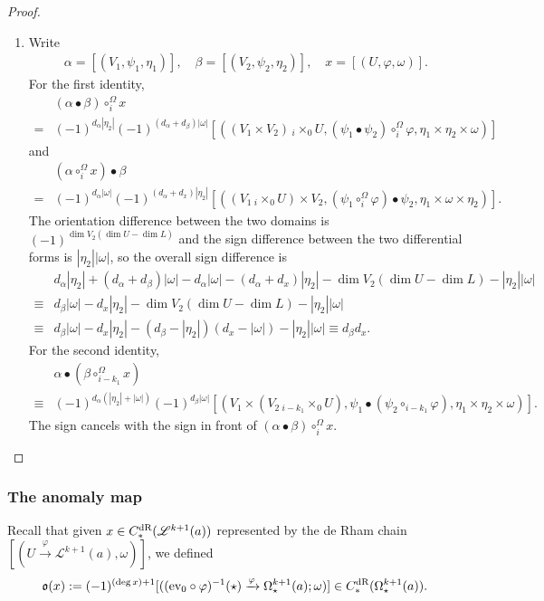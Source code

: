 \documentclass[10pt]{amsart}
\numberwithin{equation}{section}
\theoremstyle{plain}
\theoremstyle{definition}
\theoremstyle{remark}
\numberwithin{equation}{section}
\newcommand{\ev}{\textup{ev}}
\newcommand{\dR}{\textup{dR}}
\newcommand{\fiberprod}[2]{\,_{#1}\!\!\times_{#2} }
\begin{document}
{\begin{proof}
\begin{enumerate}
		\item Write \begin{align*}
			\alpha = [(V_1, \psi_1,\eta_1)], \quad \beta = [(V_2,\psi_2,\eta_2)], \quad x=[(U,\varphi,\omega)].
		\end{align*}
		For the first identity, 
		\begin{align*}
			&(\alpha\bullet \beta)\circ_i^\Omega x \\
			=& (-1)^{d_\alpha|\eta_2|} (-1)^{(d_\alpha+d_\beta)|\omega|}[((V_1\times V_2)\fiberprod{i}{0}U, (\psi_1\bullet \psi_2)\circ_i^\Omega \varphi, \eta_1\times \eta_2 \times \omega)]
		\end{align*}
		and 
		\begin{align*}
			&(\alpha\circ_i^\Omega x)\bullet \beta \\
			=&(-1)^{d_\alpha|\omega|}(-1)^{(d_\alpha +d_x)|\eta_2|}[((V_1\fiberprod{i}{0}U)\times V_2, (\psi_1\circ_i^\Omega \varphi)\bullet \psi_2, \eta_1\times \omega\times \eta_2)].
		\end{align*}
		The orientation difference between the two domains is $(-1)^{\dim V_2(\dim U-\dim L)}$ and the sign difference between the two differential forms is $|\eta_2||\omega|$, so the overall sign difference is 
		\begin{align*}
			&d_\alpha |\eta_2|+(d_\alpha+d_\beta)|\omega| - d_\alpha|\omega| -(d_\alpha + d_x)|\eta_2| -\dim V_2(\dim U - \dim L) - |\eta_2||\omega|\\
			\equiv & d_\beta|\omega| - d_x |\eta_2| - \dim V_2(\dim U -\dim L)-|\eta_2||\omega|\\
			\equiv & d_\beta |\omega| -d_x|\eta_2| - (d_\beta - |\eta_2|)(d_x - |\omega|)-|\eta_2||\omega| \equiv d_\beta d_x.
		\end{align*}
		For the second identity, 
		\begin{align*}
			& \alpha \bullet (\beta\circ_{i-k_1}^\Omega x)\\
			\equiv & (-1)^{d_\alpha(|\eta_2|+|\omega|)}(-1)^{d_\beta |\omega|}[(V_1\times (V_2\fiberprod{i-k_1}{0} U), \psi_1\bullet (\psi_2\circ_{i-k_1}\varphi), \eta_1\times \eta_2\times \omega)].
		\end{align*}
		The sign cancels with the sign in front of $(\alpha\bullet \beta)\circ_i^\Omega x$.
	\end{enumerate}
\end{proof}



\subsubsection{The anomaly map}\label{Subsubsc: SignAnomaly}
Recall that given $x\in C^\dR_*(\mathscr{L}^{k+1}(a))$ represented by the de Rham chain $[(U\xrightarrow{\varphi} \mathscr{L}^{k+1}(a), \omega)]$, we defined 
\[
	\mathfrak{o}(x) := (-1)^{(\deg x)+1} [((\ev_0\circ \varphi)^{-1}(\star)\xrightarrow{\varphi} \Omega_\star^{k+1}(a);\omega)]\in C_*^\dR(\Omega^{k+1}_\star(a)).
\]

}
\end{document}
